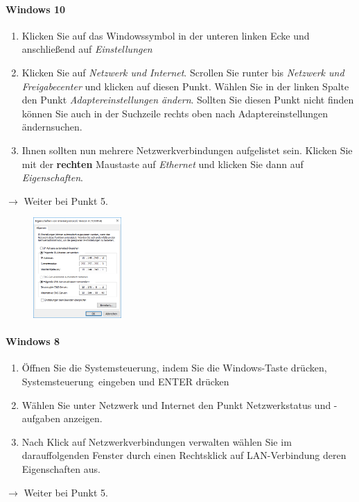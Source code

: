 \documentclass[a4paper,12pt]{scrartcl}
\begin{document}
\paragraph*{Windows 10}
\begin{enumerate}
	\item Klicken Sie auf das Windowssymbol in der unteren linken Ecke und anschließend auf \emph{Einstellungen}
	\item Klicken Sie auf \textit{Netzwerk und Internet}. Scrollen Sie runter bis \textit{Netzwerk und Freigabecenter} und klicken auf diesen Punkt. Wählen Sie in der linken Spalte den Punkt \textit{Adaptereinstellungen ändern}. Sollten Sie diesen Punkt nicht finden können Sie auch in der Suchzeile rechts oben nach \glqq Adaptereinstellungen ändern\grqq suchen.

    \item Ihnen sollten nun mehrere Netzwerkverbindungen aufgelistet sein. Klicken Sie mit der \textbf{rechten} Maustaste auf \textit{Ethernet} und klicken Sie dann auf \textit{Eigenschaften}.
\end{enumerate}
$\rightarrow$ Weiter bei Punkt 5.


\begin{figure}
\centering
  \includegraphics[width=0.3\textwidth]{Bilder/IP_Windows_mb}
\end{figure}



\paragraph*{Windows 8}
\begin{enumerate}
	\item Öffnen Sie die Systemsteuerung, indem Sie die Windows-Taste drücken, \glqq Systemsteuerung\grqq  \ eingeben und ENTER drücken
	\item Wählen Sie unter Netzwerk und Internet den Punkt Netzwerkstatus und -aufgaben anzeigen.
    \item Nach Klick auf Netzwerkverbindungen verwalten wählen Sie im darauffolgenden Fenster durch einen Rechtsklick auf LAN-Verbindung deren Eigenschaften aus.
\end{enumerate}
$\rightarrow$ Weiter bei Punkt 5.
\end{document}
